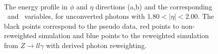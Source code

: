 \begin{figure}[ht]
    \centering
	 \\
    \caption{The energy profile in $\phi$ and $\eta$ directions (a,b) and the corresponding \Rphi \ and \Reta \ variables, for unconverted photons with 1.80$<|\eta|<$2.00. The black points correspond to the pseudo data, red points to non-reweighted simulation and blue points to the reweighted simulation from $Z\rightarrow ll\gamma$ with derived photon reweighting.}
    \label{Photon:2}
\end{figure}

